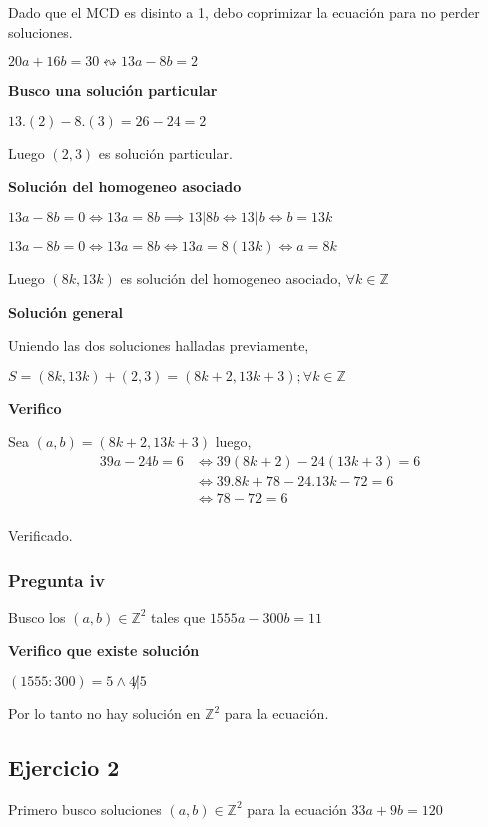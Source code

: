 Dado que el MCD es disinto a 1, debo coprimizar la ecuación para no perder soluciones.

$ 20a+16b = 30 \leftrightsquigarrow 13a-8b = 2$

\textbf{Busco una solución particular}

$ 13.(2) - 8.(3) = 26-24 = 2 $

Luego $ (2,3) $ es solución particular.

\textbf{Solución del homogeneo asociado}

$ 13a -8b = 0 \iff 13a = 8b \implies 13|8b \iff 13|b \iff b = 13k $

$ 13a -8b = 0 \iff 13a = 8b \iff 13a = 8(13k) \iff a = 8k $

Luego $ (8k,13k) $ es solución del homogeneo asociado, $ \forall k \in \mathbb{Z} $

\textbf{Solución general}

Uniendo las dos soluciones halladas previamente,

$ S = (8k,13k) + (2,3) = (8k+2, 13k+3); \forall k \in \mathbb{Z} $

\textbf{Verifico}

Sea $ (a,b) = (8k+2, 13k+3) $ luego,
\begin{align*}
    39a-24b = 6 &\iff 39(8k+2)-24(13k+3) = 6\\ 
    &\iff 39.8k+78-24.13k-72 = 6\\ 
    &\iff 78-72 = 6\\ 
\end{align*}

Verificado.

\subsubsection{Pregunta iv}

Busco los $ (a,b) \in \mathbb{Z}^2 $ tales que $ 1555a-300b = 11 $

\textbf{Verifico que existe solución}

$ (1555:300) = 5 \wedge 4\not | 5 $

Por lo tanto no hay solución en $ \mathbb{Z}^2 $ para la ecuación.

\subsection{Ejercicio 2}

Primero busco soluciones $ (a,b) \in \mathbb{Z}^2 $ para la ecuación $ 33a+9b=120 $

